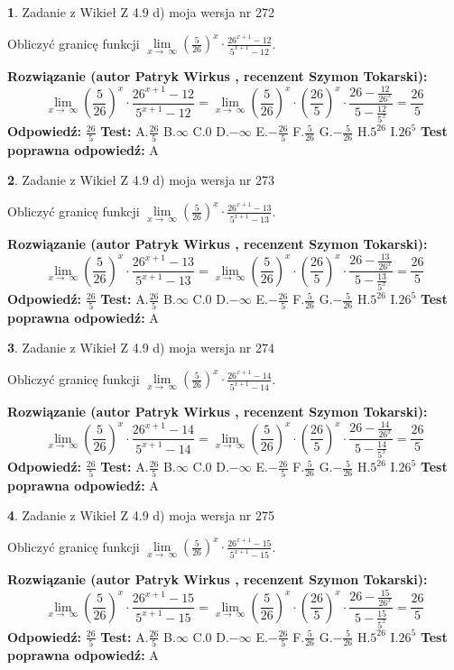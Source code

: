 \documentclass[12pt, a4paper]{article}
\theoremstyle{definition} %
\newtheorem{zad}{}
\newcommand{\zadStart}[1]{\begin{zad}#1\newline}
\newcommand{\zadStop}{\end{zad}}
\newcommand{\rozwStart}[2]{\noindent \textbf{Rozwiązanie (autor #1 , recenzent #2): }\newline}
\newcommand{\rozwStop}{\newline}
\newcommand{\odpStart}{\noindent \textbf{Odpowiedź:}\newline}
\newcommand{\odpStop}{\newline}
\newcommand{\testStart}{\noindent \textbf{Test:}\newline}
\newcommand{\testStop}{\newline}
\newcommand{\kluczStart}{\noindent \textbf{Test poprawna odpowiedź:}\newline}
\newcommand{\kluczStop}{\newline}
\begin{document}
\zadStart{Zadanie z Wikieł Z 4.9 d) moja wersja nr 272}


Obliczyć granicę funkcji  $\lim\limits_{x\to\ \infty}(\frac{5}{26})^{x}\cdot\frac{26^{x+1}-12}{5^{x+1}-12}$.
\zadStop
\rozwStart{Patryk Wirkus}{Szymon Tokarski}
$$\lim\limits_{x\to\ \infty}(\frac{5}{26})^{x}\cdot\frac{26^{x+1}-12}{5^{x+1}-12}=\lim\limits_{x\to\ \infty}(\frac{5}{26})^{x}\cdot(\frac{26}{5})^{x} \cdot \frac{26-\frac{12}{26^{x}}}{5-\frac{12}{5^{x}}} = \frac{26}{5}$$
\rozwStop
\odpStart
$\frac{26}{5}$
\odpStop
\testStart
A.$\frac{26}{5}$ B.$\infty$ C.$0$ D.$-\infty$ E.$-\frac{26}{5}$
F.$\frac{5}{26}$ G.$-\frac{5}{26}$
H.$5^{26}$
I.$26^{5}$
\testStop
\kluczStart
A
\kluczStop



\zadStart{Zadanie z Wikieł Z 4.9 d) moja wersja nr 273}


Obliczyć granicę funkcji  $\lim\limits_{x\to\ \infty}(\frac{5}{26})^{x}\cdot\frac{26^{x+1}-13}{5^{x+1}-13}$.
\zadStop
\rozwStart{Patryk Wirkus}{Szymon Tokarski}
$$\lim\limits_{x\to\ \infty}(\frac{5}{26})^{x}\cdot\frac{26^{x+1}-13}{5^{x+1}-13}=\lim\limits_{x\to\ \infty}(\frac{5}{26})^{x}\cdot(\frac{26}{5})^{x} \cdot \frac{26-\frac{13}{26^{x}}}{5-\frac{13}{5^{x}}} = \frac{26}{5}$$
\rozwStop
\odpStart
$\frac{26}{5}$
\odpStop
\testStart
A.$\frac{26}{5}$ B.$\infty$ C.$0$ D.$-\infty$ E.$-\frac{26}{5}$
F.$\frac{5}{26}$ G.$-\frac{5}{26}$
H.$5^{26}$
I.$26^{5}$
\testStop
\kluczStart
A
\kluczStop



\zadStart{Zadanie z Wikieł Z 4.9 d) moja wersja nr 274}


Obliczyć granicę funkcji  $\lim\limits_{x\to\ \infty}(\frac{5}{26})^{x}\cdot\frac{26^{x+1}-14}{5^{x+1}-14}$.
\zadStop
\rozwStart{Patryk Wirkus}{Szymon Tokarski}
$$\lim\limits_{x\to\ \infty}(\frac{5}{26})^{x}\cdot\frac{26^{x+1}-14}{5^{x+1}-14}=\lim\limits_{x\to\ \infty}(\frac{5}{26})^{x}\cdot(\frac{26}{5})^{x} \cdot \frac{26-\frac{14}{26^{x}}}{5-\frac{14}{5^{x}}} = \frac{26}{5}$$
\rozwStop
\odpStart
$\frac{26}{5}$
\odpStop
\testStart
A.$\frac{26}{5}$ B.$\infty$ C.$0$ D.$-\infty$ E.$-\frac{26}{5}$
F.$\frac{5}{26}$ G.$-\frac{5}{26}$
H.$5^{26}$
I.$26^{5}$
\testStop
\kluczStart
A
\kluczStop



\zadStart{Zadanie z Wikieł Z 4.9 d) moja wersja nr 275}


Obliczyć granicę funkcji  $\lim\limits_{x\to\ \infty}(\frac{5}{26})^{x}\cdot\frac{26^{x+1}-15}{5^{x+1}-15}$.
\zadStop
\rozwStart{Patryk Wirkus}{Szymon Tokarski}
$$\lim\limits_{x\to\ \infty}(\frac{5}{26})^{x}\cdot\frac{26^{x+1}-15}{5^{x+1}-15}=\lim\limits_{x\to\ \infty}(\frac{5}{26})^{x}\cdot(\frac{26}{5})^{x} \cdot \frac{26-\frac{15}{26^{x}}}{5-\frac{15}{5^{x}}} = \frac{26}{5}$$
\rozwStop
\odpStart
$\frac{26}{5}$
\odpStop
\testStart
A.$\frac{26}{5}$ B.$\infty$ C.$0$ D.$-\infty$ E.$-\frac{26}{5}$
F.$\frac{5}{26}$ G.$-\frac{5}{26}$
H.$5^{26}$
I.$26^{5}$
\testStop
\kluczStart
A
\kluczStop
\end{document}
